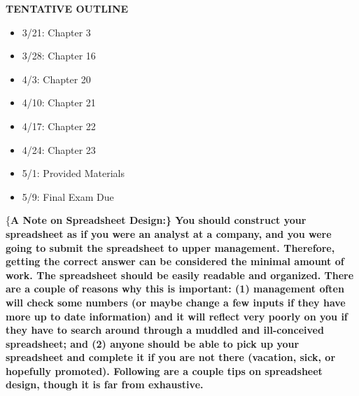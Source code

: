 \documentclass[11pt]{article}
\begin{document}
\pagebreak
\begin{center}
\textbf{TENTATIVE OUTLINE}
\end{center}
\begin{itemize}
\item 3/21:  Chapter 3
\item 3/28:  Chapter 16
\item 4/3:  Chapter 20
\item 4/10: Chapter 21
\item 4/17:  Chapter 22
\item 4/24:  Chapter 23
\item 5/1:  Provided Materials
\item 5/9:  Final Exam Due
\end{itemize}
\pagebreak
\{\bf A Note on Spreadsheet Design:\}  You should construct your spreadsheet as if you were an analyst at a company, and you were going to submit the spreadsheet to upper management.  Therefore, getting the correct answer can be considered the minimal amount of work.  The spreadsheet should be easily readable and organized.  There are a couple of reasons why this is important: (1) management often will check some numbers (or maybe change a few inputs if they have more up to date information) and it will reflect very poorly on you if they have to search around through a muddled and ill-conceived spreadsheet; and (2) anyone should be able to pick up your spreadsheet and complete it if you are not there (vacation, sick, or hopefully promoted).  Following are a couple tips on spreadsheet design, though it is far from exhaustive.\\
\end{document}
